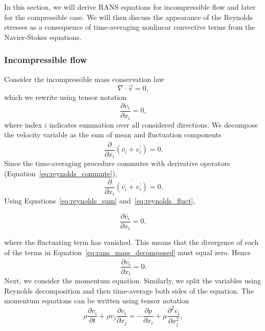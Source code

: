 In this section, we will derive RANS equations for incompressible flow and later for the compressible case. We will then discuss the appearance of the Reynolds stresses as a consequence of time-averaging nonlinear convective terms from the Navier-Stokes equations.

\subsubsection{Incompressible flow}

Consider the incompressible mass conservation law
\begin{equation}
    \nabla\cdot\vec{v} = 0,
\end{equation}
which we rewrite using tensor notation
\begin{equation}
    \frac{\partial v_i}{\partial x_i} = 0,
\end{equation}
where index $i$ indicates summation over all considered directions. We decompose the velocity variable as the sum of mean and fluctuation components
\begin{equation}
    \overline{\frac{\partial }{\partial x_i}\left(\overline{v_i} + v_i^\prime\right)} = 0.
\end{equation}
Since the time-averaging procedure commutes with derivative operators (Equation~\ref{eq:reynolds_commute}),
\begin{equation}
    \label{eq:rans_mass_decomposed}
    \frac{\partial}{\partial x_i} \overline{\left(\overline{v_i} + v_i^\prime\right)} = 0.
\end{equation}
Using Equations~\ref{eq:reynolds_sum} and~\ref{eq:reynolds_fluct},
\begin{eqBox}
\begin{equation}
	\frac{\partial \overline{v_i}}{\partial x_i} = 0,
	\label{eq:rans_continuity}
\end{equation}
\end{eqBox}
where the fluctuating term has vanished. This means that the divergence of each of the terms in Equation~\ref{eq:rans_mass_decomposed} must equal zero. Hence
\begin{equation}
	\frac{\partial v_i^\prime}{\partial x_i} = 0.
	\label{eq:rans_continuity2}
\end{equation}
Next, we consider the momentum equation. Similarly, we split the variables using Reynolds decomposition and then time-average both sides of the equation. The momentum equations can be written using tensor notation
\begin{equation}
    \label{eq:rans_momentum_initial}
    \rho\frac{\partial v_i}{\partial t} + \rho v_j\frac{\partial v_i}{\partial x_j} =
    - \frac{\partial p}{\partial x_i} + \mu \frac{\partial^2 v_i}{\partial x_j^2},
\end{equation}
